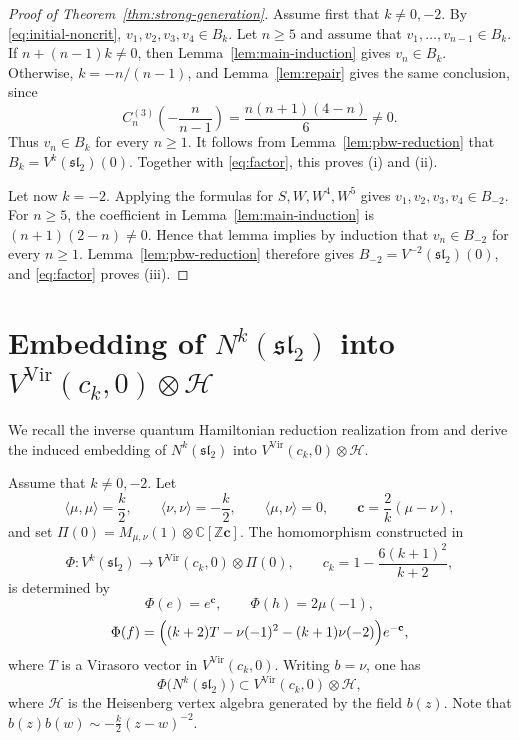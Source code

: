 \documentclass[11 pt]{amsart}
\theoremstyle{definition}
\theoremstyle{plain}
\newcommand{\Vir}{\mathrm{Vir}}
\begin{document}
\begin{proof}[Proof of Theorem~\ref{thm:strong-generation}]
Assume first that $k\neq0,-2$. By \eqref{eq:initial-noncrit},
$v_1,v_2,v_3,v_4\in B_k$. Let $n\geq5$ and assume that
$v_1,\ldots,v_{n-1}\in B_k$. If $n+(n-1)k\neq0$, then
Lemma~\ref{lem:main-induction} gives $v_n\in B_k$. Otherwise,
$k=-n/(n-1)$, and Lemma~\ref{lem:repair} gives the same conclusion,
since
\[
 C_n^{(3)}\left(-\frac{n}{n-1}\right)
 =\frac{n(n+1)(4-n)}6\neq0.
\]
Thus $v_n\in B_k$ for every $n\geq1$. It follows from
Lemma~\ref{lem:pbw-reduction} that
$B_k=V^k(\mathfrak{sl}_2)(0)$. Together with \eqref{eq:factor}, this
proves \textup{(i)} and \textup{(ii)}.

Let now $k=-2$. Applying the formulas for
$S,W,W^4,W^5$ gives $v_1,v_2,v_3,v_4\in B_{-2}$. For $n\geq5$, the
coefficient in Lemma~\ref{lem:main-induction} is
$(n+1)(2-n)\neq0$. Hence that lemma implies by induction that
$v_n\in B_{-2}$ for every $n\geq1$. Lemma~\ref{lem:pbw-reduction}
therefore gives $B_{-2}=V^{-2}(\mathfrak{sl}_2)(0)$, and
\eqref{eq:factor} proves \textup{(iii)}.
\end{proof}







\section{Embedding of $N^k(\mathfrak{sl}_2)$ into
$V^{\Vir}(c_k,0) \otimes \mathcal{H}$}
\label{sec:vir-heis-realization}
We recall the inverse quantum Hamiltonian reduction realization from
\cite{A2019} and derive the induced embedding of
$N^k(\mathfrak{sl}_2)$ into $V^{\Vir}(c_k,0)\otimes\mathcal H$.

Assume that $k\neq0,-2$.  Let
\[
\langle \mu,\mu\rangle=\frac{k}{2},\qquad
\langle \nu,\nu\rangle=-\frac{k}{2},\qquad
\langle \mu,\nu\rangle=0,
\qquad
\mathbf c=\frac{2}{k}(\mu-\nu),
\]
and set
$\Pi(0)=M_{\mu,\nu}(1)\otimes\mathbb C[\mathbb Z\mathbf c]$.
The homomorphism constructed in \cite[Proposition~3.1]{A2019}
\begin{equation}
\Phi:V^k(\mathfrak{sl}_2)\longrightarrow
V^{\Vir}(c_k,0)\otimes \Pi(0),
\qquad
c_k=1-\frac{6(k+1)^2}{k+2}, \label{inverse-embed}
\end{equation}
is determined by
\[
\Phi(e)=e^{\mathbf c},\qquad
\Phi(h)=2\mu(-1),
\]
\[
\Phi(f)=
\Bigl((k+2)T-\nu(-1)^2-(k+1)\nu(-2)\Bigr)e^{-\mathbf c},
\]
where $T$ is a Virasoro vector in  $V^{\Vir}(c_k,0)$.
Writing $b=\nu$, one has
\[
\Phi\bigl(N^k(\mathfrak{sl}_2)\bigr)
\subset V^{\Vir}(c_k,0)\otimes\mathcal H,
\]
where $\mathcal H$ is the Heisenberg vertex algebra generated by the
field $b(z)$. Note that
$b(z)b(w)\sim-\frac{k}{2}(z-w)^{-2}$.
\end{document}
